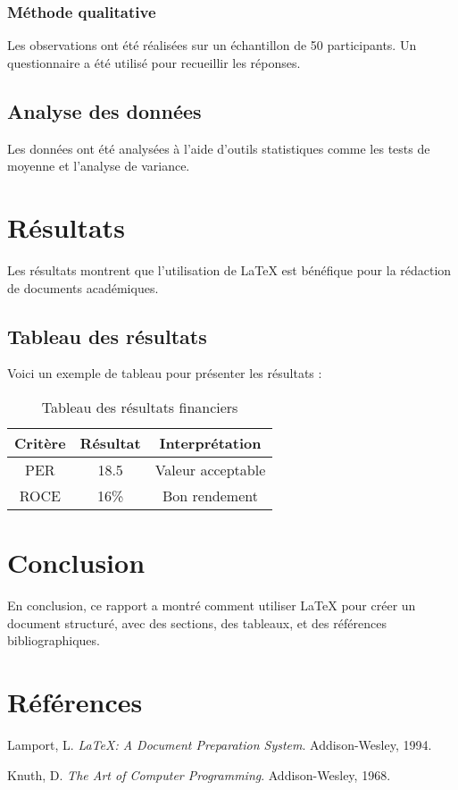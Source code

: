 \documentclass[a4paper,12pt]{report}
\begin{document}
\subsection{Méthode qualitative}
Les observations ont été réalisées sur un échantillon de 50 participants. Un questionnaire a été utilisé pour recueillir les réponses.

\section{Analyse des données}
Les données ont été analysées à l'aide d'outils statistiques comme les tests de moyenne et l'analyse de variance.

\chapter{Résultats}
Les résultats montrent que l'utilisation de \LaTeX{} est bénéfique pour la rédaction de documents académiques.

\section{Tableau des résultats}
Voici un exemple de tableau pour présenter les résultats :

\begin{table}[h!]
\centering
\begin{tabular}{|c|c|c|}
\hline
\textbf{Critère} & \textbf{Résultat} & \textbf{Interprétation} \\ \hline
PER & 18.5 & Valeur acceptable \\ \hline
ROCE & 16\% & Bon rendement \\ \hline
\end{tabular}
\caption{Tableau des résultats financiers}
\end{table}

\chapter{Conclusion}
En conclusion, ce rapport a montré comment utiliser \LaTeX{} pour créer un document structuré, avec des sections, des tableaux, et des références bibliographiques.

\chapter{Références}
\begin{thebibliography}{9}
Lamport, L. \textit{\LaTeX: A Document Preparation System}. Addison-Wesley, 1994.

Knuth, D. \textit{The Art of Computer Programming}. Addison-Wesley, 1968.
\end{thebibliography}
\end{document}
